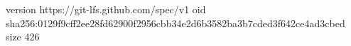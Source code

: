 version https://git-lfs.github.com/spec/v1
oid sha256:0129f9cff2ee28fd62900f2956cbb34e2d6b3582ba3b7cded3f642ce4ad3cbed
size 426
